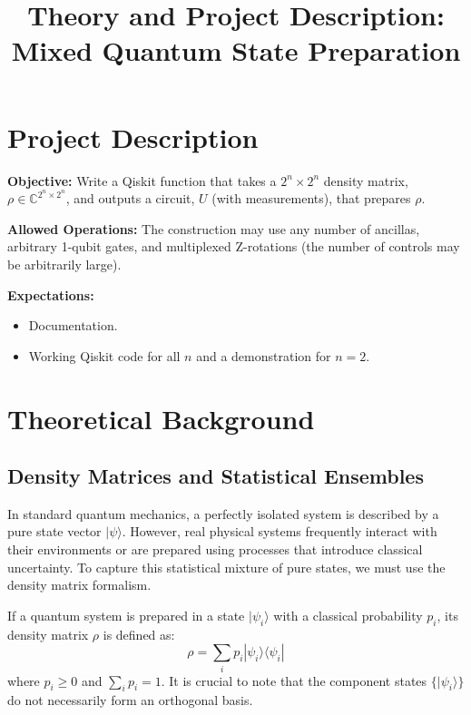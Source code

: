 \documentclass[12pt]{article}
\title{Theory and Project Description: Mixed Quantum State Preparation}
\author{}
\date{}
\begin{document}
\maketitle

\section{Project Description}

\textbf{Objective:} Write a Qiskit function that takes a $2^n \times 2^n$ density matrix, $\rho \in \mathbb{C}^{2^n \times 2^n}$, and outputs a circuit, $U$ (with measurements), that prepares $\rho$.

\noindent \textbf{Allowed Operations:} The construction may use any number of ancillas, arbitrary 1-qubit gates, and multiplexed Z-rotations (the number of controls may be arbitrarily large).

\noindent \textbf{Expectations:}
\begin{itemize}
    \item Documentation.
    \item Working Qiskit code for all $n$ and a demonstration for $n=2$.
\end{itemize}

\section{Theoretical Background}

\subsection{Density Matrices and Statistical Ensembles}
In standard quantum mechanics, a perfectly isolated system is described by a pure state vector $|\psi\rangle$. However, real physical systems frequently interact with their environments or are prepared using processes that introduce classical uncertainty. To capture this statistical mixture of pure states, we must use the density matrix formalism.

If a quantum system is prepared in a state $|\psi_i\rangle$ with a classical probability $p_i$, its density matrix $\rho$ is defined as:
\begin{equation}
    \rho = \sum_{i} p_i |\psi_i\rangle \langle \psi_i|
\end{equation}
where $p_i \geq 0$ and $\sum_i p_i = 1$. It is crucial to note that the component states $\{|\psi_i\rangle\}$ do not necessarily form an orthogonal basis.
\end{document}
